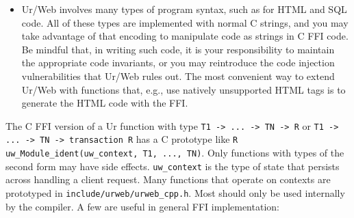 \documentclass{article}
\begin{document}
\begin{itemize}
  \item Ur/Web involves many types of program syntax, such as for HTML and SQL code.  All of these types are implemented with normal C strings, and you may take advantage of that encoding to manipulate code as strings in C FFI code.  Be mindful that, in writing such code, it is your responsibility to maintain the appropriate code invariants, or you may reintroduce the code injection vulnerabilities that Ur/Web rules out.  The most convenient way to extend Ur/Web with functions that, e.g., use natively unsupported HTML tags is to generate the HTML code with the FFI.
\end{itemize}

The C FFI version of a Ur function with type \texttt{T1 -> ... -> TN -> R} or \texttt{T1 -> ... -> TN -> transaction R} has a C prototype like \texttt{R uw\_Module\_ident(uw\_context, T1, ..., TN)}.  Only functions with types of the second form may have side effects.  \texttt{uw\_context} is the type of state that persists across handling a client request.  Many functions that operate on contexts are prototyped in \texttt{include/urweb/urweb\_cpp.h}.  Most should only be used internally by the compiler.  A few are useful in general FFI implementation:
\end{document}
